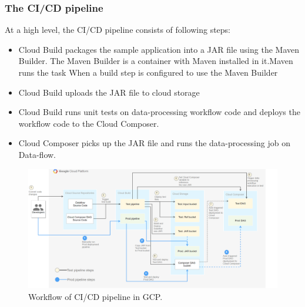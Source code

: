 \subsubsection{The CI/CD pipeline}
%
At a high level, the CI/CD pipeline consists of following steps:
\begin{itemize}
    \item Cloud Build packages the sample application into a JAR file using the Maven Builder. The Maven Builder is a container with Maven installed in it.Maven runs the task When a build step is configured to use the Maven Builder
    \item Cloud Build uploads the JAR file to cloud storage
    \item Cloud Build runs unit tests on data-processing workflow code and deploys the workflow code to the Cloud Composer.
    \item Cloud Composer picks up the JAR file and runs the data-processing job on Data-flow. 
\end{itemize}


\begin{figure}[h]
    \centering
    \includegraphics[scale=0.53]{images/cicd-pipeline-for-data-processing-1-diagram-pipeline.png}
    \caption{Workflow of CI/CD pipeline in GCP.} 
    \label{fig:gcp_cicd}
\end{figure}



